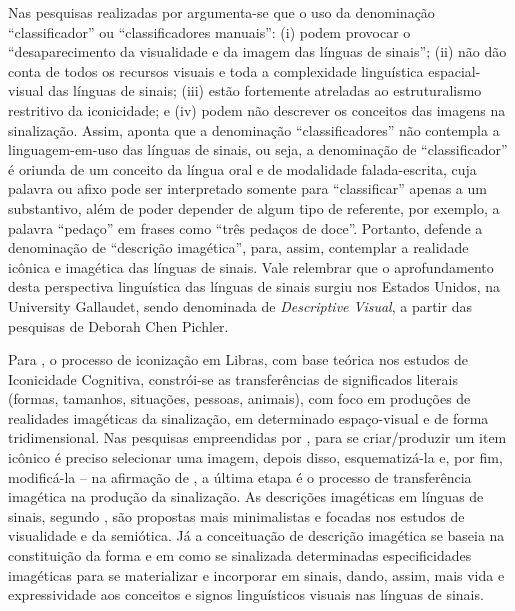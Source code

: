 \documentclass[portuguese]{textolivre}
\begin{document}
Nas pesquisas realizadas por \textcite[p.~156]{campello2008visualidade} argumenta-se que o uso da denominação “classificador” ou “classificadores manuais”: (i) podem provocar o “desaparecimento da visualidade e da imagem das línguas de sinais”; (ii) não dão conta de todos os recursos visuais e toda a complexidade linguística espacial-visual das línguas de sinais; (iii) estão fortemente atreladas ao estruturalismo restritivo da iconicidade; e (iv) podem não descrever os conceitos das imagens na sinalização. Assim, \textcite{campello2008visualidade} aponta que a denominação “classificadores” não contempla a linguagem-em-uso das línguas de sinais, ou seja, a denominação de “classificador” é oriunda de um conceito da língua oral e de modalidade falada-escrita, cuja palavra ou afixo pode ser interpretado somente para “classificar” apenas a um substantivo, além de poder depender de algum tipo de referente, por exemplo, a palavra “pedaço” em frases como “três pedaços de doce”.  Portanto, \textcite{campello2008visualidade} defende a denominação de “descrição imagética”, para, assim, contemplar a realidade icônica e imagética das línguas de sinais. Vale relembrar que o aprofundamento desta perspectiva linguística das línguas de sinais surgiu nos Estados Unidos, na University Gallaudet, sendo denominada de \textit{Descriptive Visual}, a partir das pesquisas de Deborah Chen Pichler.

Para \textcite{campello2008visualidade}, o processo de iconização em Libras, com base teórica nos estudos de Iconicidade Cognitiva, constrói-se as transferências de significados literais (formas, tamanhos, situações, pessoas, animais), com foco em produções de realidades imagéticas da sinalização, em determinado espaço-visual e de forma tridimensional. Nas pesquisas empreendidas por \textcite{taub2001language}, para se criar/produzir um item icônico é preciso selecionar uma imagem, depois disso, esquematizá-la e, por fim, modificá-la \cite[p.~50-51]{kogut2015signwriting} – na afirmação de \textcite{campello2008visualidade}, a última etapa é o processo de transferência imagética na produção da sinalização. As descrições imagéticas em línguas de sinais, segundo \textcite{campello2008visualidade}, são propostas mais minimalistas e focadas nos estudos de visualidade e da semiótica. Já a conceituação de descrição imagética se baseia na constituição da forma e em como se sinalizada determinadas especificidades imagéticas para se materializar e incorporar em sinais, dando, assim, mais vida e expressividade aos conceitos e signos linguísticos visuais nas línguas de sinais.
\end{document}
